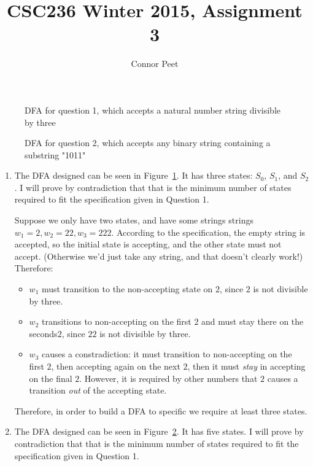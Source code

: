 \documentclass{article}
\title{CSC236 Winter 2015, Assignment 3}
\author{Connor Peet}
\begin{document}
\maketitle

\begin{figure}
    \centering
    
    \caption{DFA for question 1, which accepts a natural number string divisible by three}
    \label{fig:q1}
\end{figure}

\begin{figure}
    \centering
    
    \caption{DFA for question 2, which accepts any binary string containing a substring "1011"}
    \label{fig:q2}
\end{figure}

\begin{enumerate}

\item
    The DFA designed can be seen in Figure~\ref{fig:q1}. It has three states: $S_0$, $S_1$, and $S_2$. I will prove by contradiction that that is the minimum number of states required to fit the specification given in Question 1.

    Suppose we only have two states, and have some strings strings $w_1 = 2, w_2 = 22, w_3 = 222$. According to the specification, the empty string is accepted, so the initial state is accepting, and the other state must not accept. (Otherwise we'd just take any string, and that doesn't clearly work!) Therefore:

        \begin{itemize}
        \item $w_1$ must transition to the non-accepting state on $2$, since $2$ is not divisible by three.
        \item $w_2$ transitions to non-accepting on the first $2$ and must stay there on the seconds$2$, since $22$ is not divisible by three.
        \item $w_3$ causes a constradiction: it must transition to non-accepting on the first $2$, then accepting again on the next $2$, then it must \textit{stay} in accepting on the final $2$. However, it is required by other numbers that $2$ causes a transition \textit{out} of the accepting state.
        \end{itemize}

    Therefore, in order to build a DFA to specific we require at least three states.

\item
    The DFA designed can be seen in Figure~\ref{fig:q2}. It has five states. I will prove by contradiction that that is the minimum number of states required to fit the specification given in Question 1.


\end{enumerate}
\end{document}
